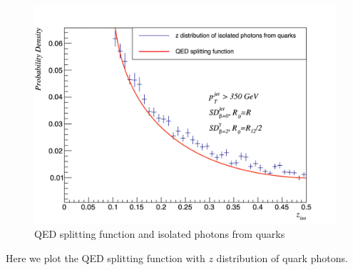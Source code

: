 \documentclass[9pt, mathserif]{beamer}
\begin{document}
        \begin{frame}
            \begin{figure}
                \centering
                \includegraphics[width=0.6\linewidth]{5.pdf}
                \caption{QED splitting function and isolated photons from quarks}
            \end{figure}
            Here we plot the QED splitting function with $z$ distribution of quark photons.
        \end{frame}
\end{document}
